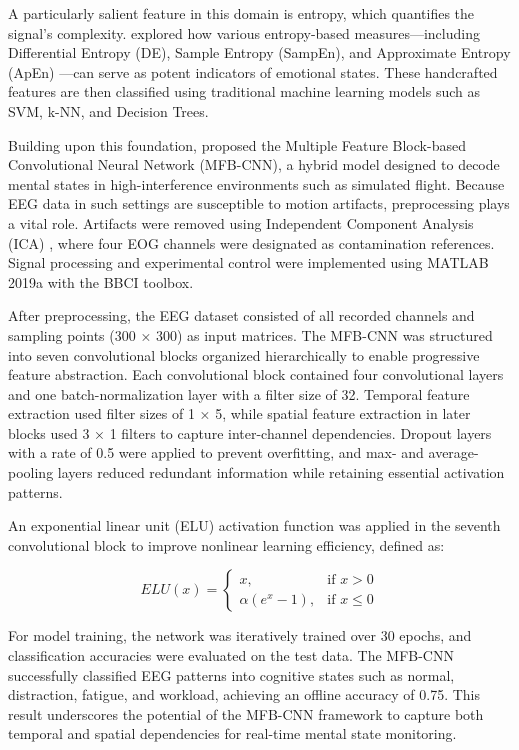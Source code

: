 \documentclass[conference]{IEEEtran}
\begin{document}
A particularly salient feature in this domain is entropy, which quantifies the signal’s complexity. \cite{Patel2021EEGEntropyReview} explored how various entropy-based measures—including Differential Entropy (DE), Sample Entropy (SampEn), and Approximate Entropy (ApEn) \cite{Patel2021EEGEntropyReview}—can serve as potent indicators of emotional states. These handcrafted features are then classified using traditional machine learning models such as SVM, k-NN, and Decision Trees.

Building upon this foundation, \cite{Lee2020MFB_CNN_PilotMentalStates} proposed the Multiple Feature Block-based Convolutional Neural Network (MFB-CNN), a hybrid model designed to decode mental states in high-interference environments such as simulated flight. Because EEG data in such settings are susceptible to motion artifacts, preprocessing plays a vital role. Artifacts were removed using Independent Component Analysis (ICA) \cite{Lee2020MFB_CNN_PilotMentalStates}, where four EOG channels were designated as contamination references. Signal processing and experimental control were implemented using MATLAB 2019a with the BBCI toolbox.

After preprocessing, the EEG dataset consisted of all recorded channels and sampling points (300 × 300) as input matrices. The MFB-CNN was structured into seven convolutional blocks organized hierarchically to enable progressive feature abstraction. Each convolutional block contained four convolutional layers and one batch-normalization layer with a filter size of 32. Temporal feature extraction used filter sizes of 1 × 5, while spatial feature extraction in later blocks used 3 × 1 filters to capture inter-channel dependencies. Dropout layers with a rate of 0.5 were applied to prevent overfitting, and max- and average-pooling layers reduced redundant information while retaining essential activation patterns.

An exponential linear unit (ELU) activation function was applied in the seventh convolutional block to improve nonlinear learning efficiency, defined as:

\begin{equation}
ELU(x) =
\begin{cases}
x, & \text{if } x > 0 \\
\alpha (e^{x} - 1), & \text{if } x \leq 0
\end{cases}
\end{equation}

For model training, the network was iteratively trained over 30 epochs, and classification accuracies were evaluated on the test data. The MFB-CNN successfully classified EEG patterns into cognitive states such as normal, distraction, fatigue, and workload, achieving an offline accuracy of 0.75. This result underscores the potential of the MFB-CNN framework to capture both temporal and spatial dependencies for real-time mental state monitoring.
\end{document}
